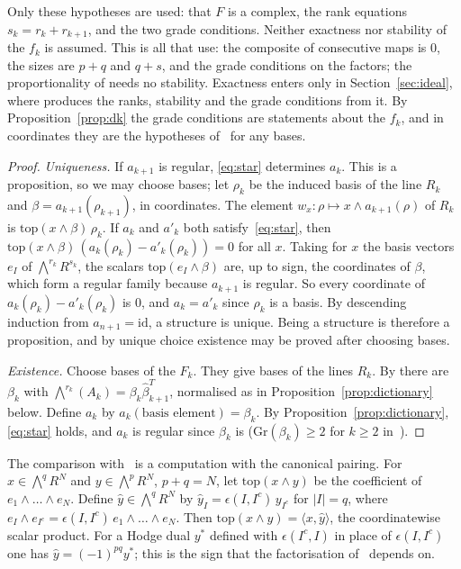 \documentclass[11pt]{amsart}
\theoremstyle{definition}
\theoremstyle{remark}
\newcommand{\Gr}{\mathrm{Gr}}
\newcommand{\Ex}{{\textstyle\bigwedge}}
\begin{document}
Only these hypotheses are used: that $F$ is a complex, the rank equations
$s_k=r_k+r_{k+1}$, and the two grade conditions.  Neither exactness nor
stability of the $f_k$ is assumed.  This is all that
\cite[Lemma~8.4 and Corollary~8.5]{CQ} use: the composite of consecutive
maps is $0$, the sizes are $p+q$ and $q+s$, and the grade conditions on the
factors; the proportionality of \cite[Lemma~8.2]{CQ} needs no stability.
Exactness enters only in Section~\ref{sec:ideal}, where
\cite[Theorem~6.8]{CQ} produces the ranks, stability and the grade
conditions from it.  By Proposition~\ref{prop:dk} the grade conditions are
statements about the $f_k$, and in coordinates they are the hypotheses
of~\cite{CQ} for any bases.

\begin{proof}
\emph{Uniqueness.}  If $a_{k+1}$ is regular, \eqref{eq:star} determines
$a_k$.  This is a proposition, so we may choose bases; let $\rho_k$ be
the induced basis of the line $R_k$ and $\beta=a_{k+1}(\rho_{k+1})$, in
coordinates.  The element $w_x:\rho\mapsto x\wedge a_{k+1}(\rho)$ of $R_k$
is $\mathrm{top}(x\wedge\beta)\,\rho_k$.  If $a_k$ and $a'_k$ both
satisfy~\eqref{eq:star}, then $\mathrm{top}(x\wedge\beta)\,(a_k(\rho_k)-
a'_k(\rho_k))=0$ for all $x$.  Taking for $x$ the basis vectors $e_I$ of
$\Ex^{r_k}R^{s_k}$, the scalars $\mathrm{top}(e_I\wedge\beta)$ are, up to
sign, the coordinates of $\beta$, which form a regular family because
$a_{k+1}$ is regular.  So every coordinate of $a_k(\rho_k)-a'_k(\rho_k)$
is $0$, and $a_k=a'_k$ since $\rho_k$ is a basis.  By descending induction
from $a_{n+1}=\mathrm{id}$, a structure is unique.  Being a structure is
therefore a proposition, and by unique choice existence may be proved
after choosing bases.

\emph{Existence.}  Choose bases of the $F_k$.  They give bases of the
lines $R_k$.  By \cite[Corollary~8.5]{CQ} there are $\beta_k$ with
$\Ex^{r_k}(A_k)=\beta_k\hat\beta_{k+1}^T$, normalised as in
Proposition~\ref{prop:dictionary} below.  Define $a_k$ by
$a_{k}(\text{basis element})=\beta_k$.  By
Proposition~\ref{prop:dictionary}, \eqref{eq:star} holds, and $a_k$ is
regular since $\beta_k$ is ($\Gr(\beta_k)\geq2$ for $k\geq2$
in~\cite{CQ}).
\end{proof}

The comparison with~\cite{CQ} is a computation with the canonical
pairing.  For $x\in\Ex^qR^N$ and $y\in\Ex^{p}R^N$, $p+q=N$, let
$\mathrm{top}(x\wedge y)$ be the coefficient of $e_1\wedge\dots\wedge
e_N$.  Define $\hat y\in\Ex^qR^N$ by $\hat y_I=\epsilon(I,I^c)\,y_{I^c}$
for $|I|=q$, where $e_I\wedge e_{I^c}=\epsilon(I,I^c)\,e_1\wedge\dots\wedge
e_N$.  Then $\mathrm{top}(x\wedge y)=\langle x,\hat y\rangle$, the
coordinatewise scalar product.  For a Hodge dual $y^*$ defined with
$\epsilon(I^c,I)$ in place of $\epsilon(I,I^c)$ one has
$\hat y=(-1)^{pq}y^*$; this is the sign that the factorisation
of~\cite[Lemma~8.4]{CQ} depends on.
\end{document}
